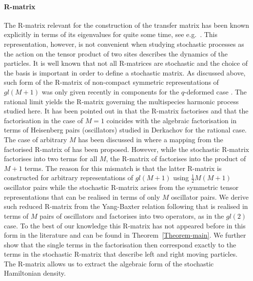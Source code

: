 \documentclass[11pt]{article}
\numberwithin{equation}{section}
\begin{document}
\paragraph{R-matrix}
The  R-matrix relevant for the construction of the transfer matrix has been known explicitly in terms of its eigenvalues for quite some time, see e.g.~\cite{NJMacKay_1991}. This representation, however, is not convenient when studying stochastic processes as the action on the tensor product of two sites describes the dynamics of the particles. It is well known that not all R-matrices are stochastic and the choice of the basis is important in order to define a stochastic matrix. As discussed above, such form of the R-matrix of non-compact symmetric representations of $gl(M+1)$ was only given recently in components for the $q$-deformed case \cite{Kuniba:2016fpi,Bosnjak:2016oze}. The rational limit yields the R-matrix governing the multispecies harmonic process studied here.  It has been pointed out in \cite{Bosnjak:2016oze} that the R-matrix factorises and that the factorisation in the case of $M=1$ coincides with the algebraic factorisation in terms of Heisenberg pairs (oscillators) studied in Derkachov \cite{Derkachov:2005hw} for the rational case. The case of arbitrary $M$ has been discussed in \cite{Bosnjak} where a mapping from the factorised R-matrix of \cite{Derkachov:2006fw} has been proposed. However, while the stochastic R-matrix factorises into two terms for all $M$, the R-matrix of \cite{Derkachov:2006fw} factorises into the product of $M+1$ terms. The reason for this mismatch is that the latter R-matrix is constructed for arbitrary representations of $gl(M+1)$ using  $\tfrac{1}{2}M(M+1)$ oscillator pairs   while the stochastic R-matrix arises from the symmetric tensor representations that can be realised in terms of only $M$ oscillator pairs. We derive such reduced R-matrix from the Yang-Baxter relation following  \cite{Derkachov:2005hw} that is realised in terms of $M$ pairs of oscillators and factorises into two operators, as in the $gl(2)$ case. To the best of our knowledge this R-matrix has not appeared before in this form in the literature and can be found in Theorem~\ref{Theorem-main}. We further show that the single terms in the factorisation then correspond exactly to the terms in the stochastic R-matrix that describe left and right moving particles. The R-matrix allows us to extract the algebraic form of the stochastic Hamiltonian density.
\end{document}
